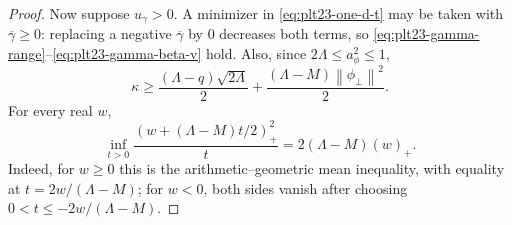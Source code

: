 \documentclass[11pt]{article}
\numberwithin{equation}{section}
\newcommand{\norm}[1]{\left\lVert #1\right\rVert}
\newcommand{\pos}[1]{\left(#1\right)_{+}}
\begin{document}
\begin{proof}
  Now suppose $u_\gamma>0$.  A minimizer in \eqref{eq:plt23-one-d-t} may be taken
  with $\overline\gamma\ge0$: replacing a negative $\overline\gamma$ by $0$
  decreases both
  terms, so \eqref{eq:plt23-gamma-range}--\eqref{eq:plt23-gamma-beta-v}
  hold.
  Also, since $2\Lambda\le a_\phi^2\le1$,
  \begin{equation}\label{eq:plt23-H-lower}
    \kappa\ge\frac{(\Lambda-q)\sqrt{2\Lambda}}{2}
    +\frac{(\Lambda-M)\norm{\phi_\perp}^2}{2}.
  \end{equation}
  For every real $w$,
  \begin{equation}\label{eq:plt23-K-AMGM}
    \inf_{t>0}\frac{\pos{w+(\Lambda-M)t/2}^2}{t}=2(\Lambda-M)\pos w.
  \end{equation}
  Indeed, for $w\ge0$ this is the arithmetic--geometric mean inequality,
  with equality at $t=2w/(\Lambda-M)$; for $w<0$, both sides vanish after
  choosing $0<t\le-2w/(\Lambda-M)$.


\end{proof}
\end{document}
